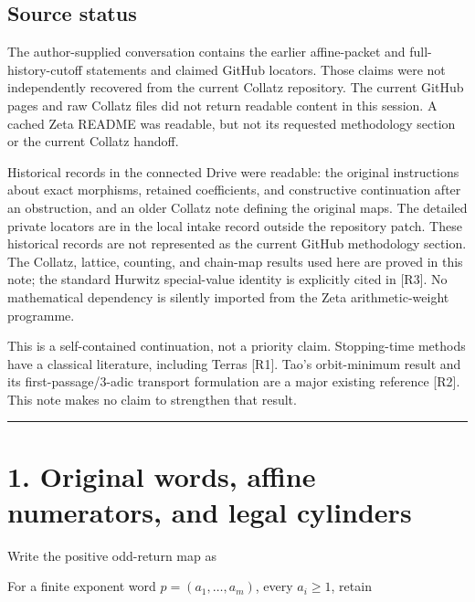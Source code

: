 \subsection{Source status}

The author-supplied conversation contains the earlier affine-packet and
full-history-cutoff statements and claimed GitHub locators. Those claims
were not independently recovered from the current Collatz repository.
The current GitHub pages and raw Collatz files did not return readable
content in this session. A cached Zeta README was readable, but not its
requested methodology section or the current Collatz handoff.

Historical records in the connected Drive were readable: the original
instructions about exact morphisms, retained coefficients, and
constructive continuation after an obstruction, and an older Collatz
note defining the original maps. The detailed private locators are in
the local intake record outside the repository patch. These historical
records are not represented as the current GitHub methodology section.
The Collatz, lattice, counting, and chain-map results used here are
proved in this note; the standard Hurwitz special-value identity is
explicitly cited in {[}R3{]}. No mathematical dependency is silently
imported from the Zeta arithmetic-weight programme.

This is a self-contained continuation, not a priority claim.
Stopping-time methods have a classical literature, including Terras
{[}R1{]}. Tao's orbit-minimum result and its first-passage/3-adic
transport formulation are a major existing reference {[}R2{]}. This note
makes no claim to strengthen that result.

\begin{center}\rule{0.5\linewidth}{0.5pt}\end{center}

\section{1. Original words, affine numerators, and legal cylinders}

Write the positive odd-return map as


For a finite exponent word \(p=(a_1,\ldots,a_m)\), every \(a_i\ge1\),
retain


